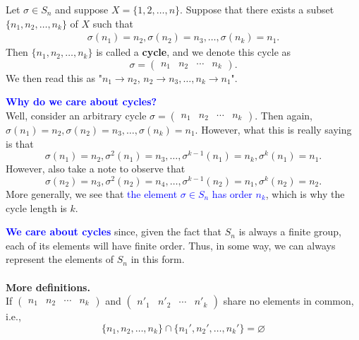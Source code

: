    \begin{definition}
        Let $\sigma \in S_n$ and suppose $X = \{1, 2, \dots, n\}.$ 
        Suppose that there exists a subset $\{n_1, n_2, \dots, n_k\}$
        of $X$
        such that 
        \begin{align*}
            \sigma(n_1) = n_2, \sigma(n_2) = n_3, \dots, \sigma(n_k) = n_1.
        \end{align*}
        Then $\{n_1, n_2, \dots, n_k\}$ is called a 
        \textbf{cycle},
        and we denote this cycle as 
        \[
            \sigma = \begin{pmatrix}
                n_1 & n_2 & \cdots & n_k
            \end{pmatrix}.
        \]
        We then read this as "$n_1 \to n_2$, $n_2 \to n_3, \dots, n_k
        \to n_1$". 

        \textcolor{Blue}{\textbf{Why do we care about cycles?}} 
        \\
        Well,
        consider an arbitrary cycle $            \sigma = \begin{pmatrix}
            n_1 & n_2 & \cdots & n_k
        \end{pmatrix}.$ Then again, $\sigma(n_1) = n_2, \sigma(n_2) =
        n_3, \dots, \sigma(n_k) = n_1.$ However, what this is really
        saying is that 
        \[
            \sigma(n_1) = n_2, \sigma^2(n_1) = n_3, \dots, \sigma^{{k-1}}(n_1) = n_k, \sigma^k(n_1) = n_1.
        \]
        However, also take a note to observe that 
        \[
            \sigma(n_2) = n_3, \sigma^2(n_2) = n_4, \dots, \sigma^{{k-1}}(n_2) = n_1, \sigma^k(n_2) = n_2.
        \]
        More generally, we see that \textcolor{blue}{the element $\sigma \in S_n$ has
        order $n_k$}, which is why the cycle length is $k$. 

        \textcolor{Blue}{\textbf{We care about cycles}} since, given the fact that $S_n$
        is always a finite group, each of its elements will have
        finite order. Thus, in some way, we can always represent the
        elements of $S_n$ in this form.
        \\
        \\
        \textbf{More definitions.}
        \\
        If $            \begin{pmatrix}
            n_1 & n_2 & \cdots & n_k
        \end{pmatrix}$ and $            \begin{pmatrix}
            n'_1 & n'_2 & \cdots & n'_k
        \end{pmatrix}$ 
        share no elements in common, i.e., 
        \[
            \{n_1, n_2, \dots, n_k\} \cap \{n_1', n_2', 
            \dots, n_k'\} = \varnothing
        \]


\end{definition}

